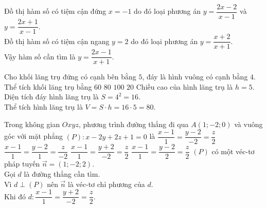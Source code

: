 \begin{ex}%
\loigiai
{
Đồ thị hàm số có tiệm cận đứng $x=-1$ do đó loại phương án $y=\dfrac{2x-2}{x-1}$ và $y=\dfrac{2x+1}{x-1}$.\\
Đồ thị hàm số có tiệm cận ngang $y=2$ do đó loại phương án $y=\dfrac{x+2}{x+1}$.\\
Vậy hàm số cần tìm là $y=\dfrac{2x-1}{x+1}$.
}
\end{ex}

\begin{ex}%
Cho khối lăng trụ đứng có cạnh bên bằng $5$, đáy là hình vuông có cạnh bằng $4$. Thể tích khối lăng trụ bằng
\choice 
{$60$} 
{\True $80$}
{$100$} 
{$20$}
\loigiai
{
Chiều cao của hình lăng trụ là $h=5$.\\
Diện tích đáy hình lăng trụ là $S=4^2=16$.\\
Thể tích hình lăng trụ là $V=S\cdot h=16\cdot 5=80 $.
}
\end{ex}

\begin{ex}%
Trong không gian $Oxyz$, phương trình đường thẳng đi qua $A(1;-2;0)$ và vuông góc với mặt phẳng $(P)\colon x-2y+2z+1=0$ là
\choice 
{$\dfrac{x-1}{1}=\dfrac{y-2}{-2}=\dfrac{z}{2}$} 
{$\dfrac{x-1}{1}=\dfrac{y-2}{1}=\dfrac{z}{-2}$}
{\True $\dfrac{x-1}{1}=\dfrac{y+2}{-2}=\dfrac{z}{2}$} 
{$\dfrac{x-1}{1}=\dfrac{y-2}{2}=\dfrac{z}{2}$}
\loigiai
{
$(P)$ có một véc-tơ pháp tuyến $\overrightarrow{n}=(1;-2;2)$.\\
Gọi $d$ là đường thẳng cần tìm.\\
Vì $d\perp (P)$ nên $\overrightarrow{n}$ là véc-tơ chỉ phương của $d$.\\
Khi đó $d\colon\dfrac{x-1}{1}=\dfrac{y+2}{-2}=\dfrac{z}{2}$.
}
\end{ex}

